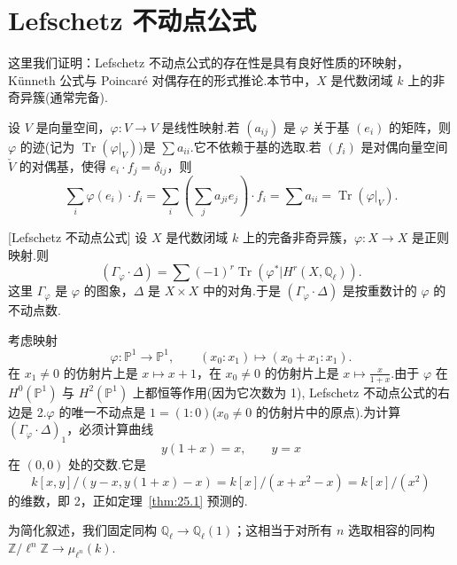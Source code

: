 ﻿%
\chapter{Lefschetz 不动点公式}\label{sec:25}

这里我们证明：Lefschetz 不动点公式的存在性是具有良好性质的环映射，K\"unneth 公式与 Poincar\'e 对偶存在的形式推论.本节中，$X$ 是代数闭域 $k$ 上的非奇异簇(通常完备).

设 $V$ 是向量空间，$\varphi \colon V \to V$ 是线性映射.若 $(a_{ij})$ 是 $\varphi$ 关于基 $(e_i)$ 的矩阵，则 $\varphi$ 的迹(记为 $\operatorname{Tr}(\varphi|_{V})$)是 $\sum a_{ii}$.它不依赖于基的选取.若 $(f_i)$ 是对偶向量空间 $\check{V}$ 的对偶基，使得 $e_i \cdot f_j = \delta_{ij}$，则
\[
\sum_{i} \varphi(e_i) \cdot f_i = \sum_{i} \left( \sum_{j} a_{ji} e_j \right) \cdot f_i = \sum a_{ii} = \operatorname{Tr}(\varphi|_{V}).
\]

\begin{theorem}\label{thm:25.1}[Lefschetz 不动点公式]
设 $X$ 是代数闭域 $k$ 上的完备非奇异簇，$\varphi \colon X \to X$ 是正则映射.则
\[
(\Gamma_{\varphi} \cdot \Delta) = \sum (-1)^{r} \operatorname{Tr}(\varphi^{*}|H^{r}(X, \mathbb{Q}_{\ell})).
\]
这里 $\Gamma_{\varphi}$ 是 $\varphi$ 的图象，$\Delta$ 是 $X \times X$ 中的对角.于是 $(\Gamma_{\varphi} \cdot \Delta)$ 是按重数计的 $\varphi$ 的不动点数.
\end{theorem}

\begin{example}\label{ex:25.2}
考虑映射
\[
\varphi \colon \mathbb{P}^{1} \to \mathbb{P}^{1}, \qquad (x_0 \colon x_1) \mapsto (x_0 + x_1 \colon x_1).
\]
在 $x_1 \neq 0$ 的仿射片上是 $x \mapsto x + 1$，在 $x_0 \neq 0$ 的仿射片上是 $x \mapsto \frac{x}{1+x}$.由于 $\varphi$ 在 $H^{0}(\mathbb{P}^{1})$ 与 $H^{2}(\mathbb{P}^{1})$ 上都恒等作用(因为它次数为 1), Lefschetz 不动点公式的右边是 2.$\varphi$ 的唯一不动点是 $1 = (1 \colon 0)$($x_0 \neq 0$ 的仿射片中的原点).为计算 $(\Gamma_{\varphi} \cdot \Delta)_1$，必须计算曲线
\[
y(1+x) = x, \qquad y = x
\]
在 $(0, 0)$ 处的交数.它是
\[
k[x, y]/(y - x, y(1+x) - x) = k[x]/(x + x^{2} - x) = k[x]/(x^{2})
\]
的维数，即 2，正如定理~\ref{thm:25.1} 预测的.
\end{example}

为简化叙述，我们固定同构 $\mathbb{Q}_{\ell} \to \mathbb{Q}_{\ell}(1)$；这相当于对所有 $n$ 选取相容的同构 $\mathbb{Z}/\ell^{n}\mathbb{Z} \to \mu_{\ell^{n}}(k)$.

